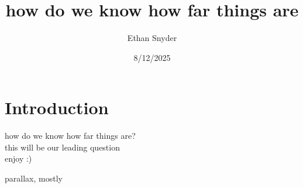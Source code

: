 \documentclass[12pt]{beamer}
\title{how do we know how far things are}
\author{Ethan Snyder}
\date{8/12/2025}
\begin{document}

\begin{frame}
    \titlepage
\end{frame}

\section{Introduction}

    \begin{frame}
        \centering
        \large how do we know how far things are?\\
        \vspace{2em}
        \normalsize this will be our leading question\\
        \vspace{2em}
        enjoy :)
    \end{frame}
    \begin{frame}
        \centering
        parallax, mostly
    \end{frame}
\end{document}
